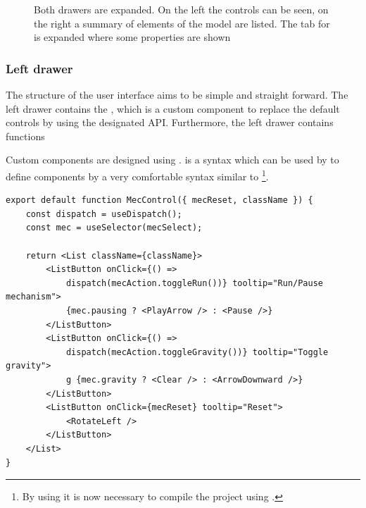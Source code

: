 \begin{figure}
    \centering
    \caption[Screenshot of the web application]{ Both drawers are expanded. On the left the  controls can be seen, on the right a summary of elements of the model are listed. The tab for  is expanded where some properties are shown }
    \label{fig:deepmech_klawr_de}
\end{figure}

\subsubsection{Left drawer}

The structure of the user interface aims to be simple and straight forward.
The left drawer contains the , which is a custom  component to replace the default  controls by using the designated API. %
Furthermore, the left drawer contains functions

Custom  components are designed using  .
 is a syntax which can be used by  to define components by a very comfortable syntax similar to \footnote{By using  it is now necessary to compile the project using .}. %

\begin{lstlisting}[label={lst:mec_control}, caption={Definition of the \name{MecControl component.}}]
export default function MecControl({ mecReset, className }) {
    const dispatch = useDispatch();
    const mec = useSelector(mecSelect);

    return <List className={className}>
        <ListButton onClick={() =>
            dispatch(mecAction.toggleRun())} tooltip="Run/Pause mechanism">
            {mec.pausing ? <PlayArrow /> : <Pause />}
        </ListButton>
        <ListButton onClick={() =>
            dispatch(mecAction.toggleGravity())} tooltip="Toggle gravity">
            g {mec.gravity ? <Clear /> : <ArrowDownward />}
        </ListButton>
        <ListButton onClick={mecReset} tooltip="Reset">
            <RotateLeft />
        </ListButton>
    </List>
}
\end{lstlisting}

